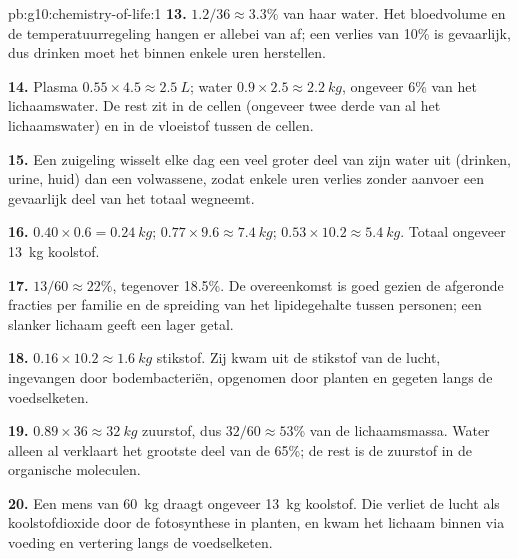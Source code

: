 \begin{solution}{pb:g10:chemistry-of-life:1}
\textbf{13.} $1.2/36 \approx 3.3\%$ van haar water. Het bloedvolume en
de temperatuurregeling hangen er allebei van af; een verlies van 10\% is
gevaarlijk, dus drinken moet het binnen enkele uren herstellen.

\textbf{14.} Plasma $0.55 \times 4.5 \approx \qty{2.5}{L}$; water $0.9
\times 2.5 \approx \qty{2.2}{kg}$, ongeveer 6\% van het lichaamswater.
De rest zit in de cellen (ongeveer twee derde van al het lichaamswater)
en in de vloeistof tussen de cellen.

\textbf{15.} Een zuigeling wisselt elke dag een veel groter deel van
zijn water uit (drinken, urine, huid) dan een volwassene, zodat enkele
uren verlies zonder aanvoer een gevaarlijk deel van het totaal wegneemt.

\textbf{16.}  $0.40 \times 0.6 = \qty{0.24}{kg}$; 
$0.77 \times 9.6 \approx \qty{7.4}{kg}$;  $0.53 \times 10.2
\approx \qty{5.4}{kg}$. Totaal ongeveer \qty{13}{kg} koolstof.

\textbf{17.} $13/60 \approx 22\%$, tegenover 18.5\%. De overeenkomst is
goed gezien de afgeronde fracties per familie en de spreiding van het
lipidegehalte tussen personen; een slanker lichaam geeft een lager
getal.

\textbf{18.} $0.16 \times 10.2 \approx \qty{1.6}{kg}$ stikstof. Zij kwam
uit de stikstof van de lucht, ingevangen door bodembacteriën, opgenomen
door planten en gegeten langs de voedselketen.

\textbf{19.} $0.89 \times 36 \approx \qty{32}{kg}$ zuurstof, dus
$32/60 \approx 53\%$ van de lichaamsmassa. Water alleen al verklaart het
grootste deel van de 65\%; de rest is de zuurstof in de organische
moleculen.

\textbf{20.} Een mens van \qty{60}{kg} draagt ongeveer \qty{13}{kg}
koolstof. Die verliet de lucht als koolstofdioxide door de fotosynthese
in planten, en kwam het lichaam binnen via voeding en vertering langs de
voedselketen.
\end{solution}
